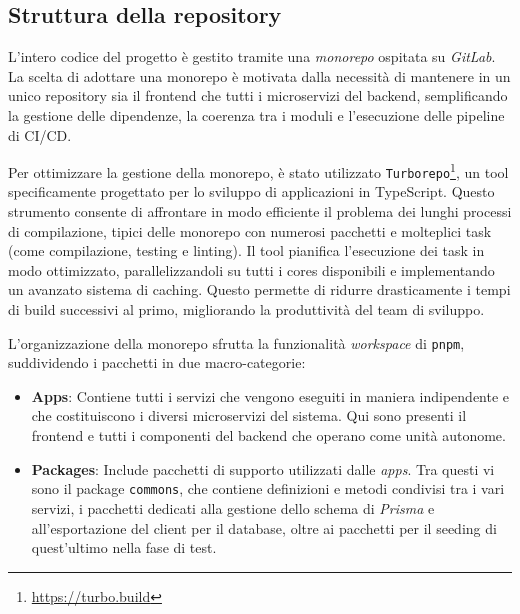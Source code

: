 \subsection{Struttura della repository}
L'intero codice del progetto è gestito tramite una \textit{monorepo} ospitata su \textit{GitLab}. La scelta di adottare una monorepo è motivata dalla necessità di mantenere in un unico repository sia il frontend che tutti i microservizi del backend, semplificando la gestione delle dipendenze, la coerenza tra i moduli e l'esecuzione delle pipeline di CI/CD.

Per ottimizzare la gestione della monorepo, è stato utilizzato \texttt{Turborepo}\footnote{\url{https://turbo.build}}, un tool specificamente progettato per lo sviluppo di applicazioni in TypeScript. Questo strumento consente di affrontare in modo efficiente il problema dei lunghi processi di compilazione, tipici delle monorepo con numerosi pacchetti e molteplici task (come compilazione, testing e linting). Il tool pianifica l'esecuzione dei task in modo ottimizzato, parallelizzandoli su tutti i cores disponibili e implementando un avanzato sistema di caching. Questo permette di ridurre drasticamente i tempi di build successivi al primo, migliorando la produttività del team di sviluppo.

L'organizzazione della monorepo sfrutta la funzionalità \textit{workspace} di \texttt{pnpm}, suddividendo i pacchetti in due macro-categorie:
\begin{itemize}
  \item \textbf{Apps}: Contiene tutti i servizi che vengono eseguiti in maniera indipendente e che costituiscono i diversi microservizi del sistema. Qui sono presenti il frontend e tutti i componenti del backend che operano come unità autonome.
  \item \textbf{Packages}: Include pacchetti di supporto utilizzati dalle \textit{apps}. Tra questi vi sono il package \texttt{commons}, che contiene definizioni e metodi condivisi tra i vari servizi, i pacchetti dedicati alla gestione dello schema di \textit{Prisma} e all'esportazione del client per il database, oltre ai pacchetti per il seeding di quest'ultimo nella fase di test.
\end{itemize}

